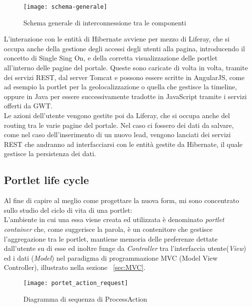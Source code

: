 \begin{figure}[h]
	\centering
	\texttt{[image: schema-generale]}
	\caption{Schema generale di interconnessione tra le componenti}
	\label{schema-generale}
\end{figure}
L'interazione con le entità di Hibernate avviene per mezzo di Liferay, che si occupa anche della gestione degli accessi degli utenti alla pagina, introducendo il concetto di Single Sing On, e della corretta visualizzazione delle \gls{portlet} all'interno delle pagine del portale. Queste sono caricate di volta in volta, tramite dei servizi REST, dal server Tomcat e possono essere scritte in AngularJS, come ad esempio la \gls{portlet} per la geolocalizzazione o quella che gestisce la timeline, oppure in Java per essere successivamente tradotte in JavaScript tramite i servizi offerti da GWT.\\
Le azioni dell'utente vengono gestite poi da Liferay, che si occupa anche del routing tra le varie pagine del portale. Nel caso ci fossero dei dati da salvare, come nel caso dell'inserimento di un nuovo lead, vengono lanciati dei servizi REST che andranno ad interfacciarsi con le entità gestite da Hibernate, il quale gestisce la persistenza dei dati.\\

\subsection{Portlet life cycle}
Al fine di capire al meglio come progettare la nuova form, mi sono concentrato sullo studio del ciclo di vita di una \gls{portlet}:\\
L'ambiente in cui una essa viene creata ed utilizzata è denominato \emph{portlet container} che, come suggerisce la parola, è un contenitore che gestisce l'aggregazione tra le \gls{portlet}, mantiene memoria delle preferenze dettate dall'utente su di esse ed inoltre funge da \emph{Controller} tra l'interfaccia utente(\emph{View}) ed i dati (\emph{Model}) nel paradigma di programmazione MVC (Model View Controller), illustrato nella sezione ~\ref{sec:MVC}.\\
\newpage
\begin{figure}[h]
	\centering
	\texttt{[image: portet\_action\_request]}
	\caption{Diagramma di sequenza di ProcessAction}
	\label{process-action}
\end{figure}

